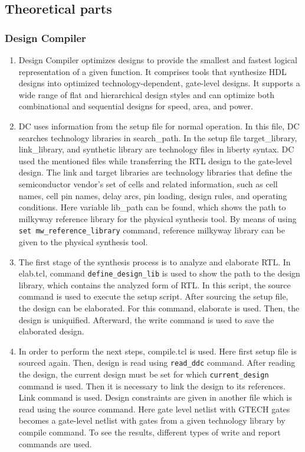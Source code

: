 \documentclass[a4paper,12pt,twoside]{article}
\begin{document}
\subsection{Theoretical parts}
\subsubsection{Design Compiler}
\begin{enumerate}
    \item Design Compiler optimizes designs to provide the smallest and fastest logical representation of a given function. It comprises tools that synthesize HDL designs into optimized technology-dependent, gate-level designs. It supports a wide range of flat and hierarchical design styles and can optimize both combinational and sequential designs for speed, area, and power.
    \item DC uses information from the setup file for normal operation. In this file, DC searches technology libraries in search\_path. In the setup file target\_library, link\_library, and synthetic library are technology files in liberty syntax. DC used the mentioned files while transferring the RTL design to the gate-level design. The link and target libraries are technology libraries that define the semiconductor vendor’s set of cells and related information, such as cell names, cell pin names, delay arcs, pin loading, design rules, and operating conditions. Here variable lib\_path can be found, which shows the path to milkyway reference library for the physical synthesis tool. By means of using \texttt{set mw\_reference\_library} command, reference milkyway library can be given to the physical synthesis tool.
    \item The first stage of the synthesis process is to analyze and elaborate RTL. In elab.tcl, command \texttt{define\_design\_lib} is used to show the path to the design library, which contains the analyzed form of RTL. In this script, the source command is used to execute the setup script. After sourcing the setup file, the design can be elaborated. For this command, elaborate is used. Then, the design is uniquified. Afterward, the write command is used to save the elaborated design.
    \item In order to perform the next steps, compile.tcl is used. Here first setup file is sourced again. Then, design is read using \texttt{read\_ddc} command. After reading the design, the current design must be set for which \texttt{current\_design} command is used. Then it is necessary to link the design to its references. Link command is used. Design constraints are given in another file which is read using the source command. Here gate level netlist with GTECH gates becomes a gate-level netlist with gates from a given technology library by compile command. To see the results, different types of write and report commands are used.
\end{enumerate}
\end{document}
